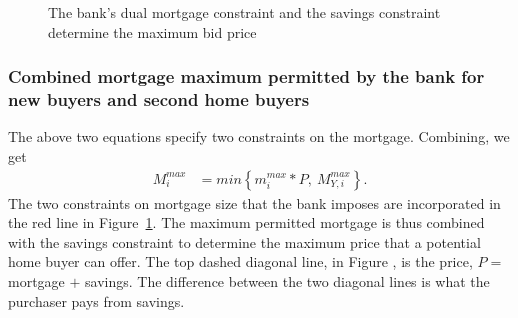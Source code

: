 {  \begin{figure}
    \centering
    
    \caption{The bank's dual mortgage constraint and the savings constraint determine the maximum bid price}
    \label{fig:dual-constraint}
    \end{figure}

\subsubsection{Combined mortgage maximum permitted by the bank for new buyers and second home buyers}

The above  two equations specify two constraints on the mortgage.  Combining, we get 
\begin{align} 
M_i^{max} &= min \left\{ m_i^{max}*P, \ M^{max}_{Y,i} \right\}. 
\label{eqn-max-mortgage-combined}
\end{align}
The two constraints on  mortgage size that the bank imposes are incorporated in the  red line in Figure~\ref{fig:dual-constraint}. The maximum  permitted mortgage is thus combined with the savings constraint to determine the maximum price that a potential home buyer can offer. The top dashed diagonal line, in Figure , is the price, $P =$ mortgage $+$ savings. The difference between the two diagonal lines is what the purchaser pays from savings. %


}
